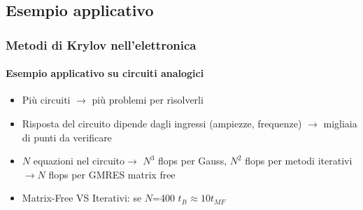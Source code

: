 \documentclass[10pt]{beamer}
\begin{document}
\subsection{Esempio applicativo}
\begin{frame}
\frametitle{Metodi di Krylov nell'elettronica}\framesubtitle{Esempio applicativo su \textbf{circuiti analogici}}
\begin{itemize}
\item Più circuiti $\to$ più problemi per risolverli
\item Risposta del circuito dipende dagli ingressi (ampiezze, frequenze) $\to$ migliaia di punti da verificare
\item $N$ equazioni nel circuito$\to$ $N^3$ flops per Gauss, $N^2$ flops per metodi iterativi$\to N$ flops per GMRES matrix free
\item Matrix-Free VS Iterativi: se $N$=400 $t_{It} \approx 10t_{MF}$
\end{itemize}
\end{frame}
\end{document}
